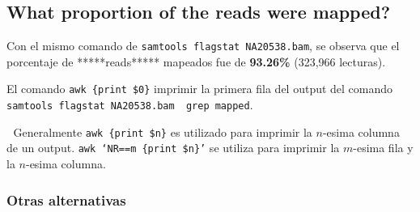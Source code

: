 \documentclass[
]{article}
\newenvironment{Shaded}{\begin{snugshade}}{\end{snugshade}}
\newcommand{\AttributeTok}[1]{\textcolor[rgb]{0.77,0.63,0.00}{#1}}
\newcommand{\CommentTok}[1]{\textcolor[rgb]{0.56,0.35,0.01}{\textit{#1}}}
\newcommand{\ErrorTok}[1]{\textcolor[rgb]{0.64,0.00,0.00}{\textbf{#1}}}
\newcommand{\ExtensionTok}[1]{#1}
\newcommand{\FunctionTok}[1]{\textcolor[rgb]{0.00,0.00,0.00}{#1}}
\newcommand{\KeywordTok}[1]{\textcolor[rgb]{0.13,0.29,0.53}{\textbf{#1}}}
\newcommand{\NormalTok}[1]{#1}
\newcommand{\StringTok}[1]{\textcolor[rgb]{0.31,0.60,0.02}{#1}}
\begin{document}
\hypertarget{what-proportion-of-the-reads-were-mapped}{%
\subsection{What proportion of the reads were
mapped?}\label{what-proportion-of-the-reads-were-mapped}}

Con el mismo comando de \texttt{samtools\ flagstat\ NA20538.bam}, se
observa que el porcentaje de *****reads***** mapeados fue de
\textbf{93.26\%} (323,966 lecturas).

\begin{Shaded}
\end{Shaded}

El comando
\texttt{awk\ \textquotesingle{}\{print\ \$0\}\textquotesingle{}}
imprimir la primera fila del output del comando
\texttt{samtools\ flagstat\ NA20538.bam\ \textbar{}\ grep\ \textquotesingle{}mapped\textquotesingle{}}.

📌 Generalmente
\texttt{awk\ \textquotesingle{}\{print\ \$n\}\textquotesingle{}} es
utilizado para imprimir la \(n\)-esima columna de un output.
\texttt{awk\ ‘NR==m\ \{print\ \$n\}’} se utiliza para imprimir la
\(m\)-esima fila y la \(n\)-esima columna.

\hypertarget{otras-alternativas-1}{%
\subsubsection{Otras alternativas}\label{otras-alternativas-1}}
\end{document}
